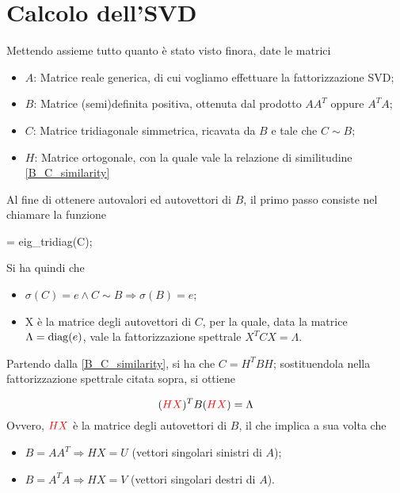 \section{Calcolo dell'SVD}
Mettendo assieme tutto quanto è stato visto finora, date le matrici
\begin{itemize}
	\item $A$: Matrice reale generica, di cui vogliamo effettuare la 
fattorizzazione SVD;
	\item $B$: Matrice (semi)definita positiva, ottenuta dal prodotto $A A^T$ 
oppure $A^T A$;
	\item $C$: Matrice tridiagonale simmetrica, ricavata da $B$ e tale che $C \sim 
B$;
	\item $H$: Matrice ortogonale, con la quale vale la relazione di similitudine 
\eqref{B_C_similarity}
\end{itemize}

Al fine di ottenere autovalori ed autovettori di $B$, il primo passo consiste 
nel chiamare la funzione
\begin{programma}
[X,e] = eig_tridiag(C);
\end{programma}

 Si ha quindi che
 \begin{itemize}
 	\item $\sigma(C) = e \wedge C \sim B \Rightarrow \sigma(B) = e$;
 	\item X è la matrice degli autovettori di $C$, per la quale, data la matrice 
$\Lambda = \operatorname{diag}(e)$, vale la fattorizzazione spettrale $X^T C X = \Lambda$.
 \end{itemize}

Partendo dalla \eqref{B_C_similarity}, si ha che $C = H^T B H$; sostituendola 
nella fattorizzazione spettrale citata sopra, si ottiene 

 \begin{equation*}
	(\textcolor{red}{H X})^T B (\textcolor{red}{H X}) = \Lambda
\end{equation*}
Ovvero, $\textcolor{red}{H X}$ è la matrice degli autovettori di $B$, il che 
implica a sua volta che

\begin{itemize}
	\item $B = A A^T \Rightarrow H X = U$ (vettori singolari sinistri di $A$);
	\item $B = A^T A \Rightarrow H X = V$ (vettori singolari destri di $A$).
\end{itemize}

